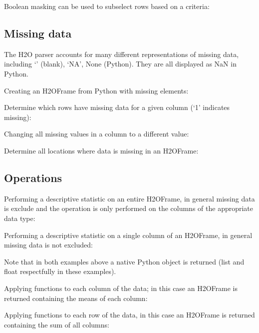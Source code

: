 Boolean masking can be used to subselect rows based on a criteria:



\subsection{Missing data}
The H2O parser accounts for many different representations of missing data, including `' (blank),
`NA', None (Python).  They are all displayed as NaN in Python.

Creating an H2OFrame from Python with missing elements:


Determine which rows have missing data for a given column (`1' indicates missing):


Changing all missing values in a column to a different value:


Determine all locations where data is missing in an H2OFrame:


\subsection{Operations}
Performing a descriptive statistic on an entire H2OFrame, in general missing data is exclude
and the operation is only performed on the columns of the appropriate data type:


Performing a descriptive statistic on a single column of an H2OFrame, in general missing data is
not excluded:


Note that in both examples above a native Python object is returned (list and float respectfully
in these examples).

Applying functions to each column of the data;
in this case an H2OFrame is returned containing the means of each column:


Applying functions to each row of the data,
in this case an H2OFrame is returned containing the sum of all columns:



